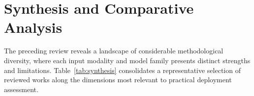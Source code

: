 \section{Synthesis and Comparative Analysis}
\label{sec:synthesis}

The preceding review reveals a landscape of considerable methodological diversity, where each input modality and model family presents distinct strengths and limitations. Table~\ref{tab:synthesis} consolidates a representative selection of reviewed works along the dimensions most relevant to practical deployment assessment.

